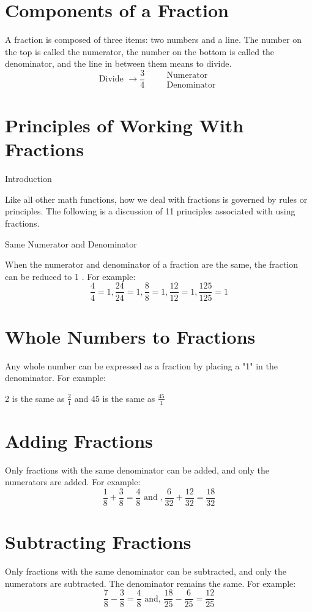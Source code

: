 \documentclass[10pt]{article}
\begin{document}
\section{Components of a Fraction}
A fraction is composed of three items: two numbers and a line. The number on the top is called the numerator, the number on the bottom is called the denominator, and the line in between them means to divide.
$$
\text { Divide } \longrightarrow \frac{3}{4} \quad \begin{aligned}
&\text { Numerator } \\
&\text { Denominator }
\end{aligned}
$$

\section{Principles of Working With Fractions}
Introduction

Like all other math functions, how we deal with fractions is governed by rules or principles. The following is a discussion of 11 principles associated with using fractions.

Same Numerator and Denominator

When the numerator and denominator of a fraction are the same, the fraction can be reduced to 1 . For example:
$$
\frac{4}{4}=1, \frac{24}{24}=1, \frac{8}{8}=1, \frac{12}{12}=1, \frac{125}{125}=1
$$

\section{Whole Numbers to Fractions}
Any whole number can be expressed as a fraction by placing a "1" in the denominator. For example:

2 is the same as $\frac{2}{1}$ and 45 is the same as $\frac{45}{1}$

\section{Adding Fractions}
Only fractions with the same denominator can be added, and only the numerators are added. For example:
$$
\frac{1}{8}+\frac{3}{8}=\frac{4}{8} \text { and }, \frac{6}{32}+\frac{12}{32}=\frac{18}{32}
$$

\section{Subtracting Fractions}
Only fractions with the same denominator can be subtracted, and only the numerators are subtracted. The denominator remains the same. For example:
$$
\frac{7}{8}-\frac{3}{8}=\frac{4}{8} \text { and, } \frac{18}{25}-\frac{6}{25}=\frac{12}{25}
$$
\end{document}
